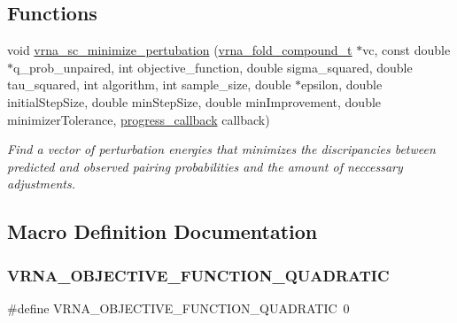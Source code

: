 \subsection*{Functions}
\begin{DoxyCompactItemize}
\item 
void \mbox{\hyperlink{group__perturbation_gaa124bdc20d88001c38ade590c4bcc3c4}{vrna\+\_\+sc\+\_\+minimize\+\_\+pertubation}} (\mbox{\hyperlink{group__fold__compound_ga1b0cef17fd40466cef5968eaeeff6166}{vrna\+\_\+fold\+\_\+compound\+\_\+t}} $\ast$vc, const double $\ast$q\+\_\+prob\+\_\+unpaired, int objective\+\_\+function, double sigma\+\_\+squared, double tau\+\_\+squared, int algorithm, int sample\+\_\+size, double $\ast$epsilon, double initial\+Step\+Size, double min\+Step\+Size, double min\+Improvement, double minimizer\+Tolerance, \mbox{\hyperlink{group__perturbation_gaa715397c7afd2d2955c315512a3d571a}{progress\+\_\+callback}} callback)
\begin{DoxyCompactList}\small\item\em Find a vector of perturbation energies that minimizes the discripancies between predicted and observed pairing probabilities and the amount of neccessary adjustments. \end{DoxyCompactList}\end{DoxyCompactItemize}


\subsection{Macro Definition Documentation}
\mbox{\label{group__perturbation_ga81e10993d1ae728e4e02022b33155a12}} 
\subsubsection{\texorpdfstring{V\+R\+N\+A\+\_\+\+O\+B\+J\+E\+C\+T\+I\+V\+E\+\_\+\+F\+U\+N\+C\+T\+I\+O\+N\+\_\+\+Q\+U\+A\+D\+R\+A\+T\+IC}{VRNA\_OBJECTIVE\_FUNCTION\_QUADRATIC}}
{\footnotesize\ttfamily \#define V\+R\+N\+A\+\_\+\+O\+B\+J\+E\+C\+T\+I\+V\+E\+\_\+\+F\+U\+N\+C\+T\+I\+O\+N\+\_\+\+Q\+U\+A\+D\+R\+A\+T\+IC~0}



